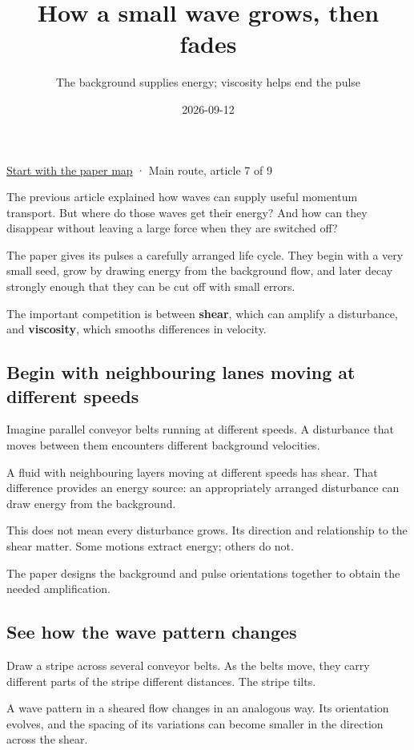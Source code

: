 \documentclass[
  english,
  11pt,
]{article}
\title{How a small wave grows, then fades}
\subtitle{The background supplies energy; viscosity helps end the pulse}
\author{}
\date{2026-09-12}
\begin{document}
\maketitle


\href{../paper-map/article.html}{Start with the paper map} · Main route,
article 7 of 9

The previous article explained how waves can supply useful momentum
transport. But where do those waves get their energy? And how can they
disappear without leaving a large force when they are switched off?

The paper gives its pulses a carefully arranged life cycle. They begin
with a very small seed, grow by drawing energy from the background flow,
and later decay strongly enough that they can be cut off with small
errors.

The important competition is between \textbf{shear}, which can amplify a
disturbance, and \textbf{viscosity}, which smooths differences in
velocity.

\subsection{Begin with neighbouring lanes moving at different
speeds}\label{begin-with-neighbouring-lanes-moving-at-different-speeds}

Imagine parallel conveyor belts running at different speeds. A
disturbance that moves between them encounters different background
velocities.

A fluid with neighbouring layers moving at different speeds has shear.
That difference provides an energy source: an appropriately arranged
disturbance can draw energy from the background.

This does not mean every disturbance grows. Its direction and
relationship to the shear matter. Some motions extract energy; others do
not.

The paper designs the background and pulse orientations together to
obtain the needed amplification.

\subsection{See how the wave pattern
changes}\label{see-how-the-wave-pattern-changes}

Draw a stripe across several conveyor belts. As the belts move, they
carry different parts of the stripe different distances. The stripe
tilts.

A wave pattern in a sheared flow changes in an analogous way. Its
orientation evolves, and the spacing of its variations can become
smaller in the direction across the shear.
\end{document}
